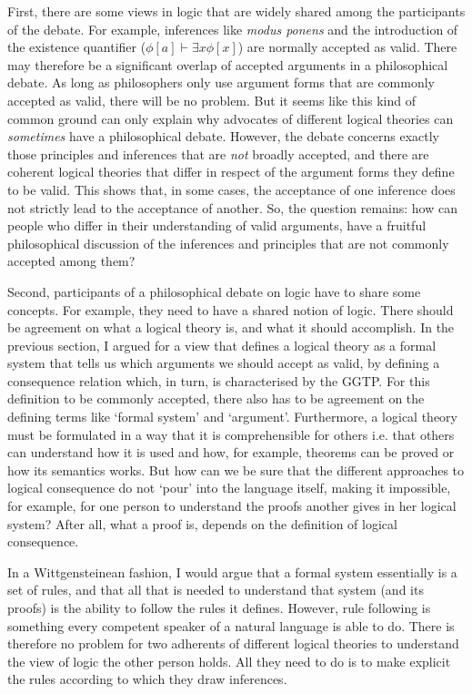 \documentclass{article}
\begin{document}
First, there are some views in logic that are widely shared among the participants of the debate. For example, inferences like \textit{modus ponens} and the introduction of the existence quantifier ($\phi[a]\vdash\exists x\phi[x]$) are normally accepted as valid. There may therefore be a significant overlap of accepted arguments in a philosophical debate. As long as philosophers only use argument forms that are commonly accepted as valid, there will be no problem. But it seems like this kind of common ground can only explain why advocates of different logical theories can \textit{sometimes} have a philosophical debate. However, the debate concerns exactly those principles and inferences that are \textit{not} broadly accepted, and there are coherent logical theories that differ in respect of the argument forms they define to be valid. This shows that, in some cases, the acceptance of one inference does not strictly lead to the acceptance of another. So, the question remains: how can people who differ in their understanding of valid arguments, have a fruitful philosophical discussion of the inferences and principles that are not commonly accepted among them?

Second, participants of a philosophical debate on logic have to share some concepts. For example, they need to have a shared notion of logic. There should be agreement on what a logical theory is, and what it should accomplish. In the previous section, I argued for a view that defines a logical theory as a formal system that tells us which arguments we should accept as valid, by defining a consequence relation which, in turn, is characterised by the GGTP. For this definition to be commonly accepted, there also has to be agreement on the defining terms like `formal system' and `argument'. Furthermore, a logical theory must be formulated in a way that it is comprehensible for others i.e. that others can understand how it is used and how, for example, theorems can be proved or how its semantics works. But how can we be sure that the different approaches to logical consequence do not `pour' into the language itself, making it impossible, for example, for one person to understand the proofs another gives in her logical system? After all, what a proof is, depends on the definition of logical consequence.

In a Wittgensteinean fashion, I would argue that a formal system essentially is a set of rules, and that all that is needed to understand that system (and its proofs) is the ability to follow the rules it defines. However, rule following is something every competent speaker of a natural language is able to do. There is therefore no problem for two adherents of different logical theories to understand the view of logic the other person holds. All they need to do is to make explicit the rules according to which they draw inferences. 
\end{document}
